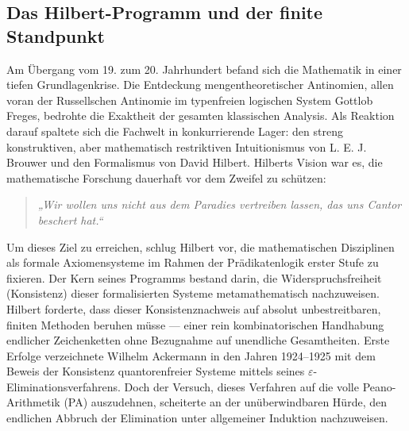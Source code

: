 \documentclass[11pt,a4paper]{article}
\begin{document}
	\subsection{Das Hilbert-Programm und der finite Standpunkt}
	Am Übergang vom 19. zum 20. Jahrhundert befand sich die Mathematik in einer tiefen Grundlagenkrise. Die Entdeckung mengentheoretischer Antinomien, allen voran der Russellschen Antinomie im typenfreien logischen System Gottlob Freges, bedrohte die Exaktheit der gesamten klassischen Analysis. Als Reaktion darauf spaltete sich die Fachwelt in konkurrierende Lager: den streng konstruktiven, aber mathematisch restriktiven Intuitionismus von L. E. J. Brouwer und den Formalismus von David Hilbert.
	Hilberts Vision war es, die mathematische Forschung dauerhaft vor dem Zweifel zu schützen:
	\begin{quote}
		\textit{„Wir wollen uns nicht aus dem Paradies vertreiben lassen, das uns Cantor beschert hat.“}
	\end{quote}
	Um dieses Ziel zu erreichen, schlug Hilbert vor, die mathematischen Disziplinen als formale Axiomensysteme im Rahmen der Prädikatenlogik erster Stufe zu fixieren. Der Kern seines Programms bestand darin, die Widerspruchsfreiheit (Konsistenz) dieser formalisierten Systeme metamathematisch nachzuweisen. Hilbert forderte, dass dieser Konsistenznachweis auf absolut unbestreitbaren, finiten Methoden beruhen müsse — einer rein kombinatorischen Handhabung endlicher Zeichenketten ohne Bezugnahme auf unendliche Gesamtheiten.
	Erste Erfolge verzeichnete Wilhelm Ackermann in den Jahren 1924–1925 mit dem Beweis der Konsistenz quantorenfreier Systeme mittels seines $\varepsilon$-Eliminationsverfahrens. Doch der Versuch, dieses Verfahren auf die volle Peano-Arithmetik (PA) auszudehnen, scheiterte an der unüberwindbaren Hürde, den endlichen Abbruch der Elimination unter allgemeiner Induktion nachzuweisen.
	
\end{document}
